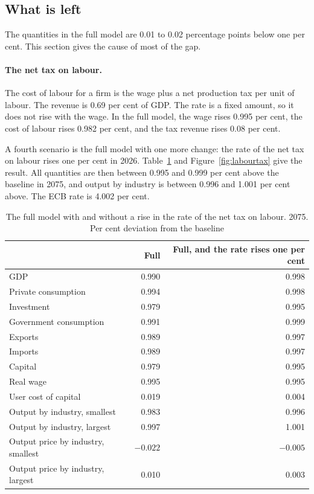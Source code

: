 \documentclass[11pt,a4paper]{article}
\begin{document}
\subsection{What is left}
\label{sec:rest}

The quantities in the full model are 0.01 to 0.02 percentage points below one per cent. This section gives the cause of most of the gap.

\paragraph{The net tax on labour.}
The cost of labour for a firm is the wage plus a net production tax per unit of labour. The revenue is 0.69 per cent of GDP. The rate is a fixed amount, so it does not rise with the wage.
In the full model, the wage rises 0.995 per cent, the cost of labour rises 0.982 per cent, and the tax revenue rises 0.08 per cent.

A fourth scenario is the full model with one more change: the rate of the net tax on labour rises one per cent in 2026. Table~\ref{tab:labourtax} and Figure~\ref{fig:labourtax} give the result.
All quantities are then between 0.995 and 0.999 per cent above the baseline in 2075, and output by industry is between 0.996 and 1.001 per cent above.
The ECB rate is 4.002 per cent.

\begin{table}[H]
\centering
\small
\caption{The full model with and without a rise in the rate of the net tax on labour. 2075. Per cent deviation from the baseline}
\label{tab:labourtax}
\begin{tabular}{@{}lrr@{}}
\toprule
 & Full & Full, and the rate rises one per cent \\
\midrule
GDP & 0.990 & 0.998 \\
Private consumption & 0.994 & 0.998 \\
Investment & 0.979 & 0.995 \\
Government consumption & 0.991 & 0.999 \\
Exports & 0.989 & 0.997 \\
Imports & 0.989 & 0.997 \\
Capital & 0.979 & 0.995 \\
Real wage & 0.995 & 0.995 \\
User cost of capital & 0.019 & 0.004 \\
\midrule
Output by industry, smallest & 0.983 & 0.996 \\
Output by industry, largest & 0.997 & 1.001 \\
Output price by industry, smallest & $-0.022$ & $-0.005$ \\
Output price by industry, largest & 0.010 & 0.003 \\
\bottomrule
\end{tabular}
\end{table}
\end{document}

